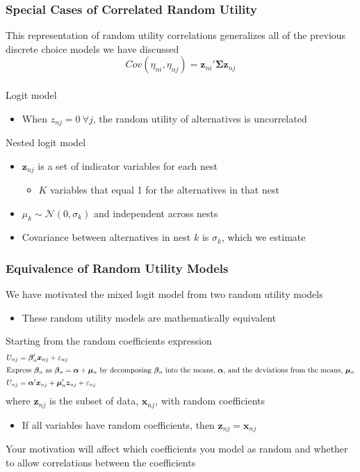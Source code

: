 \documentclass{beamer}\usepackage[]{graphicx}\usepackage[]{color}
\begin{document}
\begin{frame}\frametitle{Special Cases of Correlated Random Utility}
    This representation of random utility correlations generalizes all of the previous discrete choice models we have discussed
    $$Cov(\eta_{ni}, \eta_{nj}) = \bm{z}_{ni}' \bm{\Sigma} \bm{z}_{nj}$$ \\
    \vspace{2ex}
    Logit model
    \begin{itemize}
    	\item When $z_{nj} = 0 ~\forall j$, the random utility of alternatives is uncorrelated
    \end{itemize}
    \vspace{2ex}
    Nested logit model
    \begin{itemize}
    	\item $\bm{z}_{nj}$ is a set of indicator variables for each nest
    	\begin{itemize}
    		\item $K$ variables that equal 1 for the alternatives in that nest
    	\end{itemize}
    	\item $\mu_k \sim \mathcal{N}(0, \sigma_k)$ and independent across nests
    	\item Covariance between alternatives in nest $k$ is $\sigma_k$, which we estimate
    \end{itemize}
\end{frame}

\begin{frame}\frametitle{Equivalence of Random Utility Models}
    We have motivated the mixed logit model from two random utility models
    \begin{itemize}
    	\item These random utility models are mathematically equivalent
    \end{itemize}
    \vspace{2ex}
    Starting from the random coefficients expression
    \begin{align*}
        U_{nj} & = \bm{\beta}_n' \bm{x}_{nj} + \varepsilon_{nj} \\
        \intertext{Express $\bm{\beta}_n$ as $\bm{\beta}_n = \bm{\alpha} + \bm{\mu}_n$ by decomposing $\bm{\beta}_n$ into the means, $\bm{\alpha}$, and the deviations from the means, $\bm{\mu}_n$}
        U_{nj} & = \bm{\alpha}' \bm{x}_{nj} + \bm{\mu}_n' \bm{z}_{nj} + \varepsilon_{nj}
    \end{align*}
    where $\bm{z}_{nj}$ is the subset of data, $\bm{x}_{nj}$, with random coefficients
    \begin{itemize}
    	\item If all variables have random coefficients, then $\bm{z}_{nj} = \bm{x}_{nj}$
    \end{itemize}
    \vspace{2ex}
    Your motivation will affect which coefficients you model as random and whether to allow correlations between the coefficients
\end{frame}
\end{document}
